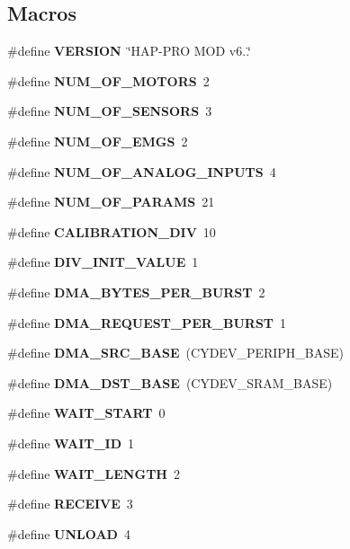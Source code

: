 \subsection*{Macros}
\begin{DoxyCompactItemize}
\item 
\mbox{\label{globals_8h_a1c6d5de492ac61ad29aec7aa9a436bbf}} 
\#define {\bfseries V\+E\+R\+S\+I\+ON}~\char`\"{}H\+AP-\/P\+RO M\+OD v6..\char`\"{}
\item 
\#define \textbf{ N\+U\+M\+\_\+\+O\+F\+\_\+\+M\+O\+T\+O\+RS}~2
\item 
\#define \textbf{ N\+U\+M\+\_\+\+O\+F\+\_\+\+S\+E\+N\+S\+O\+RS}~3
\item 
\#define \textbf{ N\+U\+M\+\_\+\+O\+F\+\_\+\+E\+M\+GS}~2
\item 
\#define \textbf{ N\+U\+M\+\_\+\+O\+F\+\_\+\+A\+N\+A\+L\+O\+G\+\_\+\+I\+N\+P\+U\+TS}~4
\item 
\#define \textbf{ N\+U\+M\+\_\+\+O\+F\+\_\+\+P\+A\+R\+A\+MS}~21
\item 
\#define \textbf{ C\+A\+L\+I\+B\+R\+A\+T\+I\+O\+N\+\_\+\+D\+IV}~10
\item 
\mbox{\label{globals_8h_a14df76a41da04070ee775565e8d67e81}} 
\#define {\bfseries D\+I\+V\+\_\+\+I\+N\+I\+T\+\_\+\+V\+A\+L\+UE}~1
\item 
\mbox{\label{globals_8h_abf6c9afec04b86961e177e0646401ace}} 
\#define {\bfseries D\+M\+A\+\_\+\+B\+Y\+T\+E\+S\+\_\+\+P\+E\+R\+\_\+\+B\+U\+R\+ST}~2
\item 
\mbox{\label{globals_8h_ab4613f8bee68bc68fa6fe94a3ae6d568}} 
\#define {\bfseries D\+M\+A\+\_\+\+R\+E\+Q\+U\+E\+S\+T\+\_\+\+P\+E\+R\+\_\+\+B\+U\+R\+ST}~1
\item 
\mbox{\label{globals_8h_a3cc2eedb40809a1f15ad841c8abbcebf}} 
\#define {\bfseries D\+M\+A\+\_\+\+S\+R\+C\+\_\+\+B\+A\+SE}~(C\+Y\+D\+E\+V\+\_\+\+P\+E\+R\+I\+P\+H\+\_\+\+B\+A\+SE)
\item 
\mbox{\label{globals_8h_aa54e301f446a66cbf8c943d920c8e967}} 
\#define {\bfseries D\+M\+A\+\_\+\+D\+S\+T\+\_\+\+B\+A\+SE}~(C\+Y\+D\+E\+V\+\_\+\+S\+R\+A\+M\+\_\+\+B\+A\+SE)
\item 
\#define \textbf{ W\+A\+I\+T\+\_\+\+S\+T\+A\+RT}~0
\item 
\#define \textbf{ W\+A\+I\+T\+\_\+\+ID}~1
\item 
\#define \textbf{ W\+A\+I\+T\+\_\+\+L\+E\+N\+G\+TH}~2
\item 
\#define \textbf{ R\+E\+C\+E\+I\+VE}~3
\item 
\#define \textbf{ U\+N\+L\+O\+AD}~4

\end{DoxyCompactItemize}
